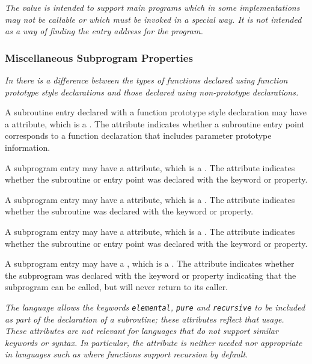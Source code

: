 \textit{The \DWCCprogram{}
value is intended to support  main
programs which in some implementations may not be callable
or which must be invoked in a special way. It is not intended
as a way of finding the entry address for the program.}


\subsubsection{Miscellaneous Subprogram Properties}
\textit{In 
there is a difference between the types of functions
declared using function prototype style declarations and
those declared using non-prototype declarations.}

A subroutine entry declared with a function prototype style
declaration may have a
\DWATprototypedDEFN{} attribute, which is
a \CLASSflag.
The attribute indicates whether a subroutine entry point corresponds
to a function declaration that includes parameter prototype information.

A subprogram entry may have
a\hypertarget{chap:DWATelementalelementalpropertyofasubroutine}{}
\DWATelementalDEFN{} attribute,
which is a .
The attribute indicates whether the subroutine
or entry point was declared with the  keyword
or property.

A\hypertarget{chap:DWATpurepurepropertyofasubroutine}{}
subprogram entry may have a
\DWATpureDEFN{} attribute, which is
a .
The attribute indicates whether the subroutine was
declared with the  keyword or property.

A\hypertarget{chap:DWATrecursiverecursivepropertyofasubroutine}{}
subprogram entry may have a
\DWATrecursiveDEFN{} attribute, which
is a .
The attribute indicates whether the subroutine
or entry point was declared with the  keyword
or property.

A subprogram entry may have a
\DWATnoreturnDEFN{}
,
which is a \CLASSflag. The attribute
indicates whether the subprogram was declared with the  keyword or property
indicating that the subprogram can be called, but will never return to its caller.

\textit{The 
language allows the keywords \texttt{elemental}, \texttt{pure}
and \texttt{recursive} to be included as part of the declaration of
a subroutine; these attributes reflect that usage. These
attributes are not relevant for languages that do not support
similar keywords or syntax. In particular, the \DWATrecursiveNAME{}
attribute is neither needed nor appropriate in languages such
as  where functions support recursion by default.}


